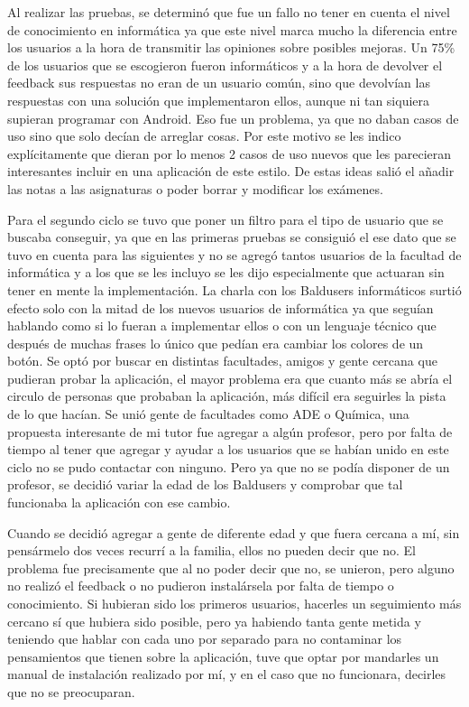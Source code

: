 Al realizar las pruebas, se determinó que fue un fallo no tener en cuenta el nivel de conocimiento en informática ya que  este nivel marca mucho la diferencia entre los usuarios a la hora de transmitir las opiniones sobre posibles mejoras.
Un 75\% de los usuarios que se escogieron fueron informáticos y a la hora de devolver el feedback sus respuestas no eran de un usuario común, sino que devolvían las respuestas con una solución que implementaron ellos, aunque ni tan siquiera supieran programar con Android.
Eso fue un problema, ya que no daban casos de uso sino que solo decían de arreglar cosas. Por este motivo se les indico explícitamente  que dieran por lo menos 2 casos de uso nuevos que les parecieran interesantes incluir en una aplicación de este estilo.
De estas ideas salió el añadir las notas a las asignaturas o poder borrar y modificar los exámenes.

Para el segundo ciclo se tuvo que poner un filtro para el tipo de usuario que se buscaba conseguir, ya que en las primeras pruebas se consiguió el ese dato que se tuvo en cuenta para las siguientes y no se agregó tantos usuarios de la facultad de informática y a los que se les incluyo se les dijo especialmente que actuaran sin tener en mente la implementación.
La charla con los Baldusers informáticos surtió efecto solo con la mitad de los nuevos usuarios de informática ya que seguían hablando como si lo fueran a implementar ellos o con un lenguaje técnico que después de muchas frases lo único que pedían era cambiar los colores de un botón. 
Se optó por buscar en distintas facultades, amigos y gente cercana que pudieran probar la aplicación, el mayor problema era que cuanto más se abría el circulo de personas que probaban la aplicación, más difícil era seguirles la pista de lo que hacían. 
Se unió gente de facultades como ADE o Química, una propuesta interesante de mi tutor fue agregar a algún profesor, pero por falta de tiempo al tener que agregar y ayudar a los usuarios que se habían unido en este ciclo no se pudo contactar con ninguno.
Pero ya que no se podía disponer de un profesor, se decidió variar la edad de los Baldusers y comprobar que tal funcionaba la aplicación con ese cambio.

Cuando se decidió agregar a gente de diferente edad y que fuera cercana a mí, sin pensármelo dos veces recurrí a la familia, ellos no pueden decir que no.
El problema fue precisamente que al no poder decir que no, se unieron,  pero alguno no realizó el feedback o no pudieron instalársela por falta de tiempo o conocimiento.
Si hubieran sido los primeros usuarios, hacerles un seguimiento más cercano sí que hubiera sido posible, pero ya habiendo tanta gente metida y teniendo que hablar con cada uno por separado para no contaminar los pensamientos que tienen sobre la aplicación, tuve que optar por mandarles un manual de instalación realizado por mí, y en el caso que no funcionara, decirles que no se preocuparan.

